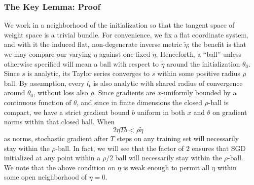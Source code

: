 \documentclass{article}
\begin{document}
        \subsubsection*{The Key Lemma: Proof}
            We work in a neighborhood of the initialization so that the tangent
            space of weight space is a trivial bundle.  For convenience, we fix
            a flat coordinate system, and with it the induced flat,
            non-degenerate inverse metric $\tilde\eta$; the benefit is that we
            may compare our varying $\eta$ against one fixed $\tilde\eta$.
            Henceforth, a ``ball'' unless otherwise specified will mean a ball
            with respect to $\tilde\eta$ around the initialization $\theta_0$.
            Since $s$ is analytic, its Taylor series converges to $s$ within
            some positive radius $\rho$ ball.  By assumption, every $l_t$ is
            also analytic with shared radius of convergence around $\theta_0$,
            without loss also $\rho$.  Since gradients are $x$-uniformly
            bounded by a continuous function of $\theta$, and since in finite
            dimensions the closed $\rho$-ball is compact, we have a strict
            gradient bound $b$ uniform in both $x$ and $\theta$ on gradient
            norms within that closed ball.  When
            \begin{equation} \label{eq:smalleta}
                2 \eta T b < \rho \tilde\eta
            \end{equation}
            as norms, stochastic gradient after $T$ steps on any training set
            will necessarily stay within the $\rho$-ball.  In fact, we will see
            that the factor of $2$ ensures that SGD initialized at any point
            within a $\rho/2$ ball will necessarily stay within the
            $\rho$-ball.  We note that the above condition on $\eta$ is weak
            enough to permit all $\eta$ within some open neighborhood of
            $\eta=0$.  
\end{document}
